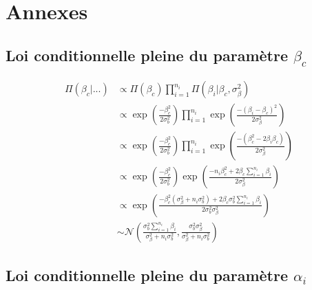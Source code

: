 \documentclass[
]{article}
\begin{document}
\newpage

\hypertarget{annexes}{%
\section{Annexes}\label{annexes}}

\hypertarget{loi-conditionnelle-pleine-du-paramuxe8tre-beta_c}{%
\subsection{\texorpdfstring{Loi conditionnelle pleine du paramètre
\(\beta_c\)}{Loi conditionnelle pleine du paramètre \textbackslash beta\_c}}\label{loi-conditionnelle-pleine-du-paramuxe8tre-beta_c}}

\begin{align*}
\Pi(\beta_{c}|...) &\propto \Pi(\beta_{c}) \prod_{i=1}^{n_{i}} \Pi(\beta_{i}|\beta_{c},\sigma_{\beta}^{2} ) \\
        &\propto \exp\left(\frac{-\beta_{c}^{2}}{2\sigma_{b}^{2}}\right)\prod_{i=1}^{n_{i}} \exp\left(\frac{-(\beta_{i}-\beta_{c})^{2}}{2\sigma_{\beta}^{2}}\right) \\
        &\propto \exp\left(\frac{-\beta_{c}^{2}}{2\sigma_{b}^{2}}\right)\prod_{i=1}^{n_{i}} \exp\left(\frac{-(\beta_{c}^{2}-2\beta_{i}\beta_{c})}{2\sigma_{\beta}^{2}}\right) \\
        &\propto \exp\left(\frac{-\beta_{c}^{2}}{2\sigma_{b}^{2}}\right) \exp\left(\frac{-n_i\beta_{c}^{2}+2\beta_{c}\sum\limits_{i=1}^{n_{i}} \beta_{i}}{2\sigma_{\beta}^{2}}\right)\\
        &\propto \exp\left(\frac{-\beta_{c}^{2}(\sigma_{\beta}^{2}+n_i\sigma_{b}^{2}) +2\beta_{c}\sigma_{b}^{2}\sum\limits_{i=1}^{n_{i}} \beta_{i}}{2\sigma_{b}^{2}\sigma_{\beta}^{2}}\right)\\
        &\sim \mathcal{N}\left(\frac{\sigma_{b}^{2}\sum\limits_{i=1}^{n_{i}} \beta_{i}}{\sigma_{\beta}^{2}+n_{i}\sigma_{b}^{2}},\frac{\sigma_{b}^{2}\sigma_{\beta}^{2}}{\sigma_{\beta}^{2}+n_{i}\sigma_{b}^{2}}\right)
\end{align*}

\hypertarget{loi-conditionnelle-pleine-du-paramuxe8tre-alpha_i}{%
\subsection{\texorpdfstring{Loi conditionnelle pleine du paramètre
\(\alpha_i\)}{Loi conditionnelle pleine du paramètre \textbackslash alpha\_i}}\label{loi-conditionnelle-pleine-du-paramuxe8tre-alpha_i}}
\end{document}
